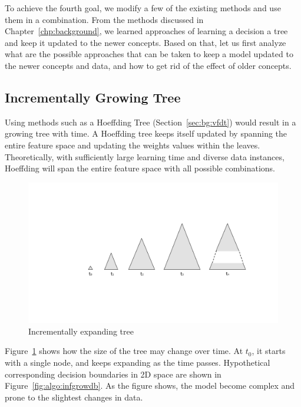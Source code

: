To achieve the fourth goal, we modify a few of the existing methods and use them in a combination. From the methods discussed in Chapter~\ref{chp:background}, we learned approaches of learning a decision a tree and keep it updated to the newer concepts. Based on that, let us first analyze what are the possible approaches that can be taken to keep a model updated to the newer concepts and data, and how to get rid of the effect of older concepts.

\subsection{Incrementally Growing Tree}
Using methods such as a Hoeffding Tree (Section~\ref{sec:bg:vfdt}) would result in a growing tree with time. A Hoeffding tree keeps itself updated by spanning the entire feature space and updating the weights values within the leaves. Theoretically, with sufficiently large learning time and diverse data instances, Hoeffding will span the entire feature space with all possible combinations.

\begin{figure}[htbp]
    \begin{center}
        \includegraphics[width=14.0cm]{figs/infgrow.pdf}
        \caption{Incrementally expanding tree}
        \label{fig:algo:infgrow}
    \end{center}
\end{figure}

Figure~\ref{fig:algo:infgrow} shows how the size of the tree may change over time. At $t_0$, it starts with a single node, and keeps expanding as the time passes. Hypothetical corresponding decision boundaries in 2D space are shown in Figure~\ref{fig:algo:infgrowdb}. As the figure shows, the model become complex and prone to the slightest changes in data.

